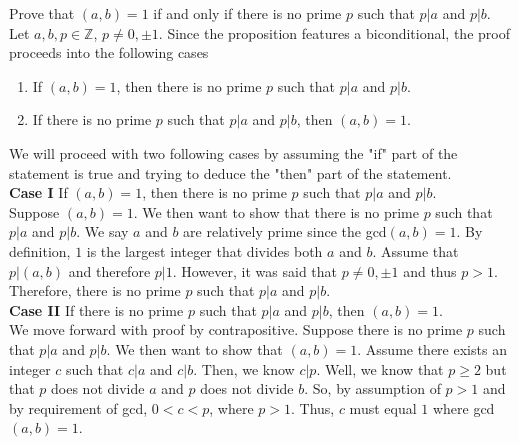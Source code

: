 \documentclass[12pt]{article}
\newcommand{\Z}{\mathbb{Z}}
\newenvironment{problem}[2][Problem]{\begin{trivlist}
\item[\hskip \labelsep {\bfseries #1}\hskip \labelsep {\bfseries #2.}]}{\end{trivlist}}
\begin{document}
\begin{problem}{3}
Prove that $(a,b)=1$ if and only if there is no prime $p$ such that $p|a$ and $p|b$. \\

\noindent
Let $a,b,p \in \Z$, $p \neq 0, \pm 1$. Since the proposition features a biconditional, the proof proceeds into the following cases

\begin{center}
\begin{enumerate}
\item If $(a,b)=1$, then there is no prime $p$ such that $p|a$ and $p|b$.
\item If there is no prime $p$ such that $p|a$ and $p|b$, then $(a,b)=1$.
\end{enumerate}
\end{center}

\noindent
We will proceed with two following cases by assuming the "if" part of the statement is true and trying to deduce the "then" part of the statement. \\

\noindent
\textbf{Case I} If $(a,b)=1$, then there is no prime $p$ such that $p|a$ and $p|b$. \\

\noindent
Suppose $(a,b)=1$. We then want to show that there is no prime $p$ such that $p|a$ and $p|b$. We say $a$ and $b$ are relatively prime since the gcd$(a,b)=1$. By definition, $1$ is the largest integer that divides both $a$ and $b$. Assume that $p|(a,b)$ and therefore $p|1$. However, it was said that $p \neq 0, \pm 1$ and thus $p>1$. Therefore, there is no prime $p$ such that $p|a$ and $p|b$. \\

\noindent
\textbf{Case II} If there is no prime $p$ such that $p|a$ and $p|b$, then $(a,b)=1$. \\

\noindent
We move forward with proof by contrapositive. Suppose there is no prime $p$ such that $p|a$ and $p|b$. We then want to show that $(a,b)=1$. Assume there exists an integer $c$ such that $c|a$ and $c|b$. Then, we know $c|p$. Well, we know that $p \geq 2$ but that $p$ does not divide $a$ and $p$ does not divide $b$. So, by assumption of $p>1$ and by requirement of gcd, $0<c<p$, where $p>1$. Thus, $c$ must equal $1$ where gcd$(a,b)=1$.

\end{problem}

\end{document}
